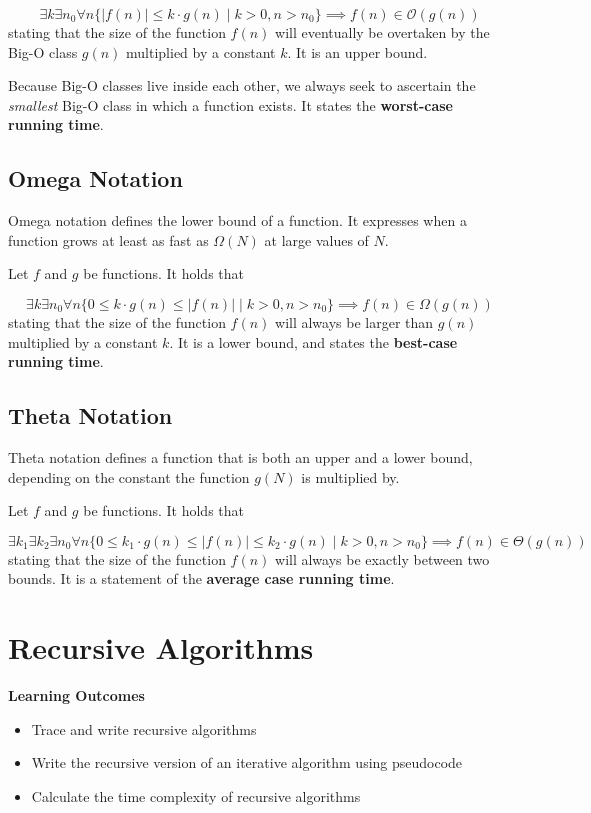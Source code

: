 \[
    \exists k \exists n_0 \forall n \{|f(n)| \leq k \cdot g(n) \mid k > 0, n > n_0  \} \implies f(n) \in \mathcal{O}(g(n))
\]
stating that the size of the function \( f(n) \) will eventually be overtaken by the Big-O class \( g(n) \) multiplied by a constant \( k \). It is an upper bound.

Because Big-O classes live inside each other, we always seek to ascertain the \emph{smallest} Big-O class in which a function exists. It states the \textbf{worst-case running time}.

\subsection{Omega Notation}

Omega notation defines the lower bound of a function. It expresses when a function grows at least as fast as \(\Omega(N)\) at large values of \(N\).

Let \( f \) and \( g \) be functions. It holds that

\[
    \exists k \exists n_0 \forall n \{0 \leq k \cdot g(n) \leq |f(n)| \mid k > 0, n > n_0  \} \implies f(n) \in \Omega(g(n))
\]
stating that the size of the function \( f(n) \) will always be larger than \( g(n) \) multiplied by a constant \( k \). It is a lower bound, and states the \textbf{best-case running time}.

\subsection{Theta Notation}

Theta notation defines a function that is both an upper and a lower bound, depending on the constant the function \(g(N)\) is multiplied by.

Let \( f \) and \( g \) be functions. It holds that

\[
    \exists k_1 \exists k_2 \exists n_0 \forall n \{0 \leq k_1 \cdot g(n) \leq |f(n)| \leq k_2 \cdot g(n) \mid k > 0, n > n_0  \} \implies f(n) \in \Theta(g(n))
\]
stating that the size of the function \( f(n) \) will always be exactly between two bounds. It is a statement of the \textbf{average case running time}.



\section{Recursive Algorithms}
\begin{mdframed}
    \textbf{Learning Outcomes}
    \begin{itemize}[label={\checkmark}]
        \item Trace and write recursive algorithms
        \item Write the recursive version of an iterative algorithm using pseudocode
        \item Calculate the time complexity of recursive algorithms
    \end{itemize}
\end{mdframed}

